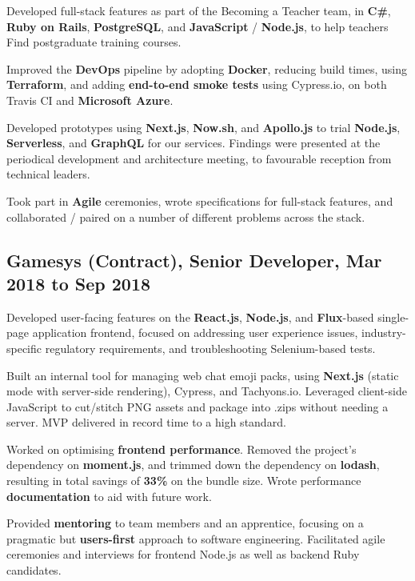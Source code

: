 \documentclass{article}
\begin{document}
Developed full-stack features as part of the Becoming a Teacher team, in
\textbf{C\#}, \textbf{Ruby on Rails}, \textbf{PostgreSQL}, and
\textbf{JavaScript} / \textbf{Node.js}, to help teachers Find postgraduate
training courses.

Improved the \textbf{DevOps} pipeline by adopting \textbf{Docker}, reducing
build times, using \textbf{Terraform}, and adding \textbf{end-to-end smoke
tests} using Cypress.io, on both Travis CI and \textbf{Microsoft Azure}.

Developed prototypes using \textbf{Next.js}, \textbf{Now.sh}, and
\textbf{Apollo.js} to trial \textbf{Node.js}, \textbf{Serverless}, and
\textbf{GraphQL} for our services. Findings were presented at the periodical
development and architecture meeting, to favourable reception from technical
leaders.

Took part in \textbf{Agile} ceremonies, wrote specifications for full-stack
features, and collaborated / paired on a number of different problems across the
stack.

\subsection*{Gamesys (Contract), Senior Developer, Mar 2018 to Sep 2018}

Developed user-facing features on the \textbf{React.js}, \textbf{Node.js}, and
\textbf{Flux}-based single-page application frontend, focused on addressing user
experience issues, industry-specific regulatory requirements, and
troubleshooting Selenium-based tests.

Built an internal tool for managing web chat emoji packs, using \textbf{Next.js}
(static mode with server-side rendering), Cypress, and Tachyons.io. Leveraged
client-side JavaScript to cut/stitch PNG assets and package into .zips without
needing a server. MVP delivered in record time to a high standard.

Worked on optimising \textbf{frontend performance}. Removed the project's
dependency on \textbf{moment.js}, and trimmed down the dependency on
\textbf{lodash}, resulting in total savings of \textbf{33\%} on the bundle size.
Wrote performance \textbf{documentation} to aid with future work.

Provided \textbf{mentoring} to team members and an apprentice, focusing on a
pragmatic but \textbf{users-first} approach to software engineering. Facilitated
agile ceremonies and interviews for frontend Node.js as well as backend Ruby
candidates.
\end{document}
